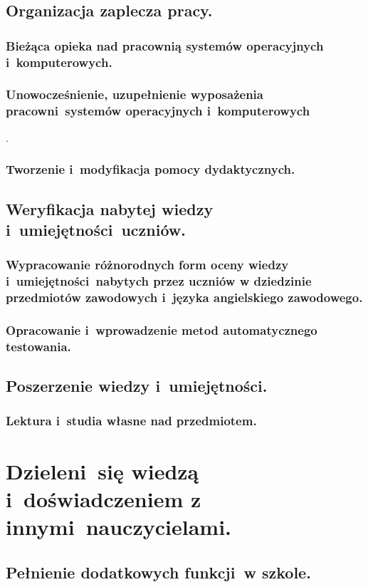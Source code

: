 \documentclass[a4paper,titlepage,13pt,draft]{mwart}
\begin{document}
\begin{flushleft}
\subsection{Organizacja zaplecza pracy.}
\subsubsection{Bieżąca opieka nad pracownią systemów operacyjnych i~komputerowych.}
\subsubsection{Unowocześnienie, uzupełnienie wyposażenia pracowni~systemów operacyjnych i~komputerowych}.
\subsubsection{Tworzenie i~modyfikacja pomocy dydaktycznych.}

\subsection{Weryfikacja nabytej wiedzy i~umiejętności~uczniów.}
\subsubsection{Wypracowanie różnorodnych form oceny wiedzy i~umiejętności~nabytych przez uczniów w dziedzinie przedmiotów zawodowych i~języka angielskiego zawodowego.}
\subsubsection{Opracowanie i~wprowadzenie metod automatycznego testowania.}\label{autotest}
\subsection{Poszerzenie wiedzy i~umiejętności.}
\subsubsection{Lektura i~studia własne nad przedmiotem.}
\section{Dzieleni~się wiedzą i~doświadczeniem z innymi~nauczycielami.}
\subsection{Pełnienie dodatkowych funkcji~w szkole.}\label{funkcje}

\end{flushleft}
\end{document}
